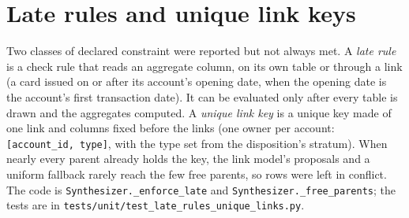 \section{Late rules and unique link keys}\label{sec:v76latekeys}
\setcounter{savedproplatekeys}{\value{proposition}}
Two classes of declared constraint were reported but not always met. A \emph{late rule} is a check rule that reads an aggregate column, on its own table or through a link (a card issued on or after its account's opening date, when the opening date is the account's first transaction date). It can be evaluated only after every table is drawn and the aggregates computed. A \emph{unique link key} is a unique key made of one link and columns fixed before the links (one owner per account: \texttt{[account\_id, type]}, with the type set from the disposition's stratum). When nearly every parent already holds the key, the link model's proposals and a uniform fallback rarely reach the few free parents, so rows were left in conflict. The code is \texttt{Synthesizer.\_enforce\_late} and \texttt{Synthesizer.\_free\_parents}; the tests are in \texttt{tests/unit/test\_late\_rules\_unique\_links.py}.

